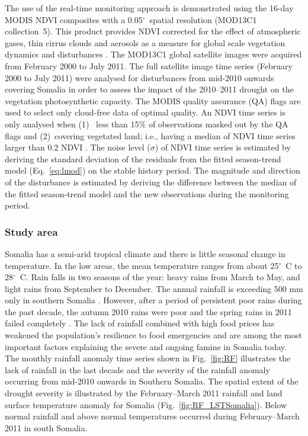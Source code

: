 \documentclass[authoryear,preprint,review,10pt]{elsarticle}
\newcommand{\degree}{\ensuremath{^\circ}}
\begin{document}
The use of the real-time monitoring approach is demonstrated using the 16-day MODIS NDVI composites with a 0.05\degree \ spatial resolution (MOD13C1 collection~5). This product provides  NDVI corrected for the effect of atmospheric gases, thin cirrus clouds and aerosols as a measure for global scale vegetation dynamics and disturbances \citep{Huete2002}. The MOD13C1 global satellite images were acquired from February 2000 to July 2011. The full satellite image time series  (February 2000 to July 2011) were analysed for disturbances from mid-2010 onwards covering Somalia in order to assess the impact of the 2010--2011 drought on the vegetation photosynthetic capacity. The MODIS quality assurance (QA) flags are used to select only cloud-free data of optimal quality. An NDVI time series is only analysed when (1)~ less than 15\% of observations masked out by the QA flags and (2)~covering vegetated land; i.e., having a median of NDVI time series larger than 0.2 NDVI \citep{Beurs2009, deJong:wo, Vrieling:2011da}. The noise level ($\sigma$) of NDVI time series is estimated by deriving the standard deviation of the residuals from the fitted season-trend model (Eq.~\ref{eq:lmod}) on the stable history period.  The magnitude and direction of the disturbance is estimated by deriving the difference between the median of the fitted season-trend model and the new observations during the monitoring period.

\subsubsection*{Study area}

Somalia has a semi-arid tropical climate and there is little seasonal change in temperature. In the low areas, the mean temperature ranges from about 25\degree~C to 28\degree~C.  Rain falls in two seasons of the year: heavy rains from March to May, and light rains from September to December. The annual rainfall is exceeding 500 mm only in southern Somalia \citep{Muchiri2007}. However, after a period of persistent poor rains during the past decade, the autumn 2010 rains were poor and the spring rains in 2011 failed completely \citep{Funk:2011fg}. The lack of rainfall combined with high food prices has weakened the population's resilience to food emergencies and are among the most important factors explaining the severe and ongoing famine in Somalia today. The monthly rainfall anomaly time series shown in Fig.~\ref{fig:RF} illustrates the lack of rainfall in the last decade and the severity of the rainfall anomaly occurring from mid-2010 onwards in Southern Somalia. The spatial extent of the drought severity is illustrated by the February--March 2011 rainfall \citep{Xie:1997tw} and land surface temperature anomaly for Somalia (Fig.~\ref{fig:RF_LSTSomalia}). Below normal rainfall and above normal temperatures occurred during February--March 2011 in south Somalia.
\end{document}
